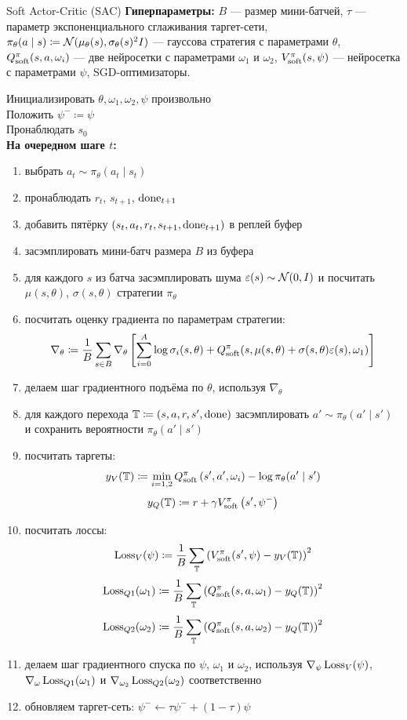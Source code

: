 \begin{algorithm}[label = SACalgorithm]{Soft Actor-Critic (SAC)}
\textbf{Гиперпараметры:} $B$ --- размер мини-батчей, $\tau$ --- параметр экспоненциального сглаживания таргет-сети, $\pi_{\theta}(a \mid s) \coloneqq \mathcal{N}(\mu_{\theta}(s), \sigma_{\theta}(s)^2 I)$ --- гауссова стратегия с параметрами $\theta$, $Q^\pi_{\mathrm{soft}}(s, a, \omega_i)$ --- две нейросетки с параметрами $\omega_1$ и $\omega_2$, $V^\pi_{\mathrm{soft}}(s, \psi)$ --- нейросетка с параметрами $\psi$, SGD-оптимизаторы.

\vspace{0.3cm}
Инициализировать $\theta, \omega_1, \omega_2, \psi$ произвольно \\
Положить $\psi^- \coloneqq \psi$ \\
Пронаблюдать $s_0$ \\
\textbf{На очередном шаге $t$:}
\begin{enumerate}
    \item выбрать $a_t \sim \pi_\theta(a_t \mid s_t)$
    \item пронаблюдать $r_t$,  $s_{t+1}$, $\mathrm{done}_{t+1}$
    \item добавить пятёрку $(s_t, a_t, r_t, s_{t+1}, \mathrm{done}_{t+1})$ в реплей буфер
    \item засэмплировать мини-батч размера $B$ из буфера
    \item для каждого $s$ из батча засэмплировать шума $\varepsilon(s) \sim \mathcal{N}(0, I)$ и посчитать $\mu(s, \theta)$, $\sigma(s, \theta)$ стратегии $\pi_\theta$
    \item посчитать оценку градиента по параметрам стратегии:
    $$\nabla_\theta \coloneqq \frac{1}{B}\sum_{s \in B} \nabla_\theta \left[ \sum_{i=0}^A \log \sigma_i(s, \theta) + Q^\pi_{\mathrm{soft}}(s, \mu(s, \theta) + \sigma(s, \theta) \varepsilon(s), \omega_1) \right]$$
    \item делаем шаг градиентного подъёма по $\theta$, используя $\nabla_\theta$
    \item для каждого перехода $\mathbb{T} \coloneqq (s, a, r, s', \mathrm{done})$ засэмплировать $a' \sim \pi_\theta(a' \mid s')$ и сохранить вероятности $\pi_\theta(a' \mid s')$
    \item посчитать таргеты:
    $$y_V(\mathbb{T} ) \coloneqq \min_{i = 1, 2} Q^\pi_{\mathrm{soft}}\left( s', a', \omega_i \right) - \log \pi_\theta(a' \mid s')$$
    $$y_Q(\mathbb{T} ) \coloneqq r + \gamma V^\pi_{\mathrm{soft}}\left( s', \psi^{-} \right)$$
    \item посчитать лоссы:
    $$\operatorname{Loss}_V(\psi) \coloneqq \frac{1}{B}\sum_{\mathbb{T}} \left( V^\pi_{\mathrm{soft}}(s', \psi) - y_V(\mathbb{T} ) \right) ^2$$
    $$\operatorname{Loss}_{Q1}(\omega_1) \coloneqq \frac{1}{B}\sum_{\mathbb{T}} \left( Q^\pi_{\mathrm{soft}}(s, a, \omega_1) - y_Q(\mathbb{T} ) \right) ^2$$
    $$\operatorname{Loss}_{Q2}(\omega_2) \coloneqq \frac{1}{B}\sum_{\mathbb{T}} \left( Q^\pi_{\mathrm{soft}}(s, a, \omega_2) - y_Q(\mathbb{T} ) \right) ^2$$
    \item делаем шаг градиентного спуска по $\psi$, $\omega_1$ и $\omega_2$, используя $\nabla_\psi \operatorname{Loss}_V(\psi)$, $\nabla_\omega \operatorname{Loss}_{Q1}(\omega_1)$ и $\nabla_{\omega_2} \operatorname{Loss}_{Q2}(\omega_2)$ соответственно
    \item обновляем таргет-сеть: $\psi^{-} \leftarrow \tau \psi^{-} + (1 - \tau) \psi$
\end{enumerate}
\end{algorithm}
